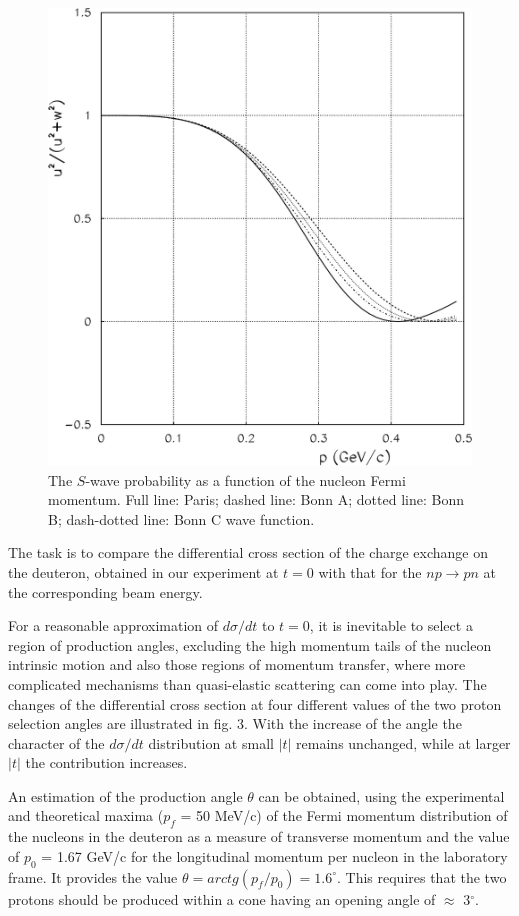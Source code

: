 \documentclass[epj]{svjour}
\begin{document}
\begin{figure}
  \centering
  \includegraphics[width=0.95\columnwidth]{fig2.pdf}
  \caption{The $S$-wave probability as a function of the nucleon Fermi momentum.
    Full line: Paris; dashed line: Bonn A; dotted line: Bonn B; dash-dotted
    line: Bonn C wave function.}
\end{figure}

The task is to compare the differential cross section of the charge exchange on
the deuteron, obtained in our experiment at $t=0$ with that for the $np\to pn$
at the corresponding beam energy.

For a reasonable approximation of $d\sigma/dt$ to $t=0$, it is inevitable to
select a region of production angles, excluding the high momentum tails of the
nucleon intrinsic motion and also those regions of momentum transfer, where more
complicated mechanisms than quasi-elastic scattering can come into play. The
changes of the differential cross section at four different values of the two
proton selection angles are illustrated in fig. 3. With the increase of the
angle the character of the $d\sigma/dt$ distribution at small $\vert t \vert$
remains unchanged, while at larger $\vert t \vert$ the contribution increases.

An estimation of the production angle $\theta$ can be obtained, using the
experimental and theoretical maxima ($p_f$ = 50 MeV/c) of the Fermi momentum
distribution of the nucleons in the deuteron as a measure of transverse momentum
and the value of $p_0$ = 1.67 GeV/c for the longitudinal momentum per nucleon in
the laboratory frame. It provides the value
$\theta=arctg(p_f/p_0)=1.6^{\circ}$. This requires that the two protons should
be produced within a cone having an opening angle of $\approx$ 3$^{\circ}$.
\end{document}
